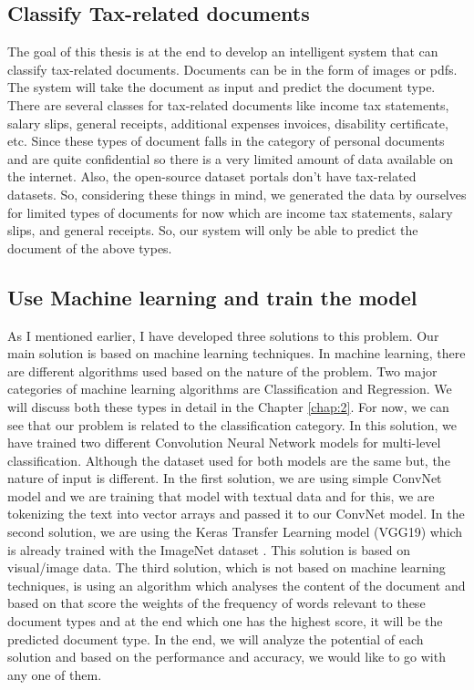 \subsection{Classify Tax-related documents}
The goal of this thesis is at the end to develop an intelligent system that can classify tax-related documents. Documents can be in the form of images or pdfs. The system will take the document as input and predict the document type. There are several classes for tax-related documents like income tax statements, salary slips, general receipts, additional expenses invoices, disability certificate, etc. Since these types of document falls in the category of personal documents and are quite confidential so there is a very limited amount of data available on the internet. Also, the open-source dataset portals don't have tax-related datasets. So, considering these things in mind, we generated the data by ourselves for limited types of documents for now which are income tax statements, salary slips, and general receipts. So, our system will only be able to predict the document of the above types.
\newline
\par
\subsection{Use Machine learning and train the model}
As I mentioned earlier, I have developed three solutions to this problem. Our main solution is based on machine learning techniques. In machine learning, there are different algorithms used based on the nature of the problem. Two major categories of machine learning algorithms are Classification and Regression. We will discuss both these types in detail in the Chapter \ref{chap:2}. For now, we can see that our problem is related to the classification category. In this solution, we have trained two different Convolution Neural Network models for multi-level classification. Although the dataset used for both models are the same but, the nature of input is different. In the first solution, we are using simple ConvNet model and we are training that model with textual data and for this, we are tokenizing the text into vector arrays and passed it to our ConvNet model. In the second solution, we are using the Keras Transfer Learning model (VGG19) which is already trained with the ImageNet dataset \cite{ILSVRC15} \cite{transfer_learning_1}. This solution is based on visual/image data. The third solution, which is not based on machine learning techniques, is using an algorithm which analyses the content of the document and based on that score the weights of the frequency of words relevant to these document types and at the end which one has the highest score, it will be the predicted document type. In the end, we will analyze the potential of each solution and based on the performance and accuracy, we would like to go with any one of them.
\par
